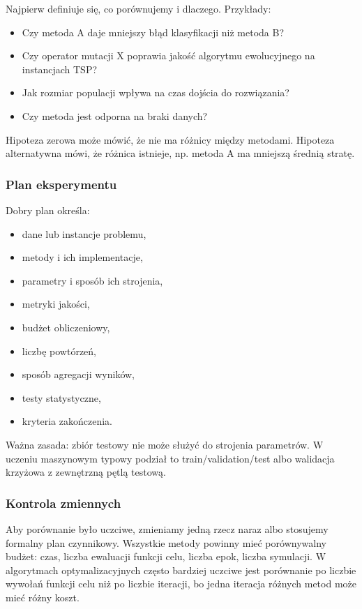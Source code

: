 Najpierw definiuje się, co porównujemy i dlaczego. Przykłady:
\begin{itemize}
  \item Czy metoda A daje mniejszy błąd klasyfikacji niż metoda B?
  \item Czy operator mutacji X poprawia jakość algorytmu ewolucyjnego na instancjach TSP?
  \item Jak rozmiar populacji wpływa na czas dojścia do rozwiązania?
  \item Czy metoda jest odporna na braki danych?
\end{itemize}

Hipoteza zerowa może mówić, że nie ma różnicy między metodami. Hipoteza alternatywna mówi, że różnica istnieje, np. metoda A ma mniejszą średnią stratę.

\subsubsection{Plan eksperymentu}

Dobry plan określa:
\begin{itemize}
  \item dane lub instancje problemu,
  \item metody i ich implementacje,
  \item parametry i sposób ich strojenia,
  \item metryki jakości,
  \item budżet obliczeniowy,
  \item liczbę powtórzeń,
  \item sposób agregacji wyników,
  \item testy statystyczne,
  \item kryteria zakończenia.
\end{itemize}

Ważna zasada: zbiór testowy nie może służyć do strojenia parametrów. W uczeniu maszynowym typowy podział to train/validation/test albo walidacja krzyżowa z zewnętrzną pętlą testową.

\subsubsection{Kontrola zmiennych}

Aby porównanie było uczciwe, zmieniamy jedną rzecz naraz albo stosujemy formalny plan czynnikowy. Wszystkie metody powinny mieć porównywalny budżet: czas, liczba ewaluacji funkcji celu, liczba epok, liczba symulacji. W algorytmach optymalizacyjnych często bardziej uczciwe jest porównanie po liczbie wywołań funkcji celu niż po liczbie iteracji, bo jedna iteracja różnych metod może mieć różny koszt.

